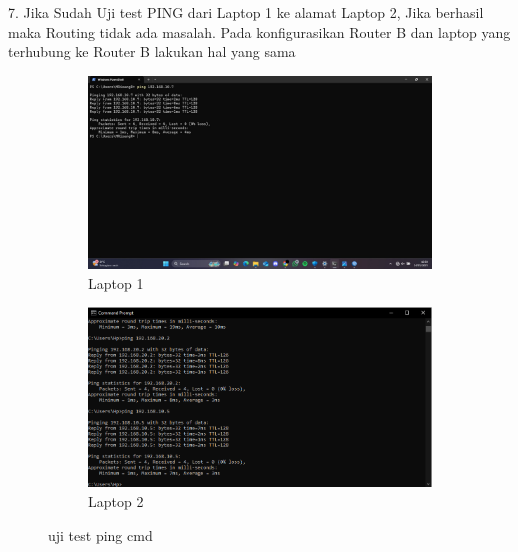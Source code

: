 7. Jika Sudah Uji test PING dari Laptop 1 ke alamat Laptop 2, Jika berhasil maka Routing tidak ada masalah. Pada konfigurasikan Router B dan laptop yang terhubung ke Router B lakukan hal yang sama
\begin{figure}[H]
    \centering
    \begin{subfigure}[b]{0.3\linewidth}
      \centering
      \includegraphics[width=\linewidth]{image/wb7.jpg}
      \caption{Laptop 1}
    \end{subfigure}
    \hspace{1cm}
    \begin{subfigure}[b]{0.3\linewidth}
      \centering
      \includegraphics[width=\linewidth]{image/wb5.png}
      \caption{Laptop 2}
    \end{subfigure}
    \caption{uji test ping cmd}
\end{figure}

